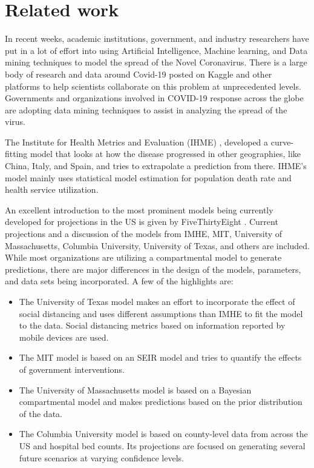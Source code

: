 \documentclass[11pt]{article}
\begin{document}
\section{Related work}
In recent weeks, academic institutions, government, and industry researchers have put in a lot of effort into using Artificial Intelligence, Machine learning, and Data mining techniques to model the spread of the Novel Coronavirus. There is a large body of research and data around Covid-19 posted on Kaggle and other platforms to help scientists collaborate on this problem at unprecedented levels. Governments and organizations involved in COVID-19 response across the globe are adopting data mining techniques to assist in analyzing the spread of the virus.

The Institute for Health Metrics and Evaluation (IHME) \cite{ihme}, developed a curve-fitting model that looks at how the disease progressed in other geographies, like China, Italy, and Spain, and tries to extrapolate a prediction from there. IHME’s model mainly uses statistical model estimation for population death rate and health service utilization. 

An excellent introduction to the most prominent models being currently developed for projections in the US is given by FiveThirtyEight \cite{latest-models}. Current projections and a discussion of the models from IMHE, MIT, University of Massachusetts, Columbia University, University of Texas, and others are included. While most organizations are utilizing a compartmental model to generate predictions, there are major differences in the design of the models, parameters, and data sets being incorporated. A few of the highlights are:
\begin{itemize}
    \item The University of Texas model makes an effort to incorporate the effect of social distancing and uses different assumptions than IMHE to fit the model to the data. Social distancing metrics based on information reported by mobile devices are used.
    \item The MIT model is based on an SEIR model and tries to quantify the effects of government interventions.
    \item The University of Massachusetts model is based on a Bayesian compartmental model and makes predictions based on the prior distribution of the data.
    \item The Columbia University model is based on county-level data from across the US and hospital bed counts. Its projections are focused on generating several future scenarios at varying confidence levels.
\end{itemize}
\end{document}

